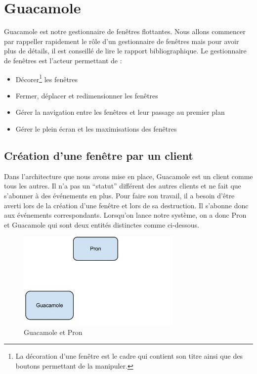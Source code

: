 \section{Guacamole}

Guacamole est notre gestionnaire de fenêtres flottantes.
Nous allons commencer par rappeller rapidement le rôle d'un gestionnaire de fenêtres mais pour avoir plus de détails, il est conseillé de lire le rapport bibliographique.
Le gestionnaire de fenêtres est l'acteur permettant de :

\begin{itemize}
  \item Décorer\footnote{La décoration d'une fenêtre est le cadre qui contient son titre ainsi que des boutons permettant de la manipuler.} les fenêtres
  \item Fermer, déplacer et redimensionner les fenêtres
  \item Gérer la navigation entre les fenêtres et leur passage au premier plan
  \item Gérer le plein écran et les maximisations des fenêtres
\end{itemize}

\subsection{Création d'une fenêtre par un client}

Dans l'architecture que nous avons mise en place, Guacamole est un client comme tous les autres.
Il n'a pas un ``statut'' différent des autres clients et ne fait que s'abonner à des événements en plus.
Pour faire son travail, il a besoin d'être averti lors de la création d'une fenêtre et lors de sa destruction.
Il s'abonne donc aux événements correspondants.
Lorsqu'on lance notre système, on a donc Pron et Guacamole qui sont deux entités distinctes comme ci-dessous.

\begin{figure}[H]
  \centering
  \includegraphics[width=8cm]{images/Guacamole_anim_1.jpg}
  \caption{Guacamole et Pron}
  \label{fig:guacamole_anim_1}
\end{figure}

